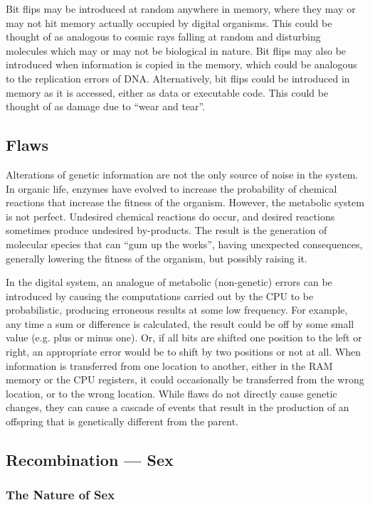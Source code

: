 Bit flips may be introduced at random anywhere in memory, where they
may or may not hit memory actually occupied by digital organisms.
This could be thought of as analogous to cosmic rays falling at random
and disturbing molecules which may or may not be biological in nature.
Bit flips may also be introduced when information is copied in the
memory, which could be analogous to the replication errors of DNA.
Alternatively, bit flips could be introduced in memory as it is accessed,
either as data or executable code.  This could be thought of as damage
due to ``wear and tear''.

\subsection{Flaws}

Alterations of genetic information are not the only source of noise in
the system.  In organic life, enzymes have evolved to increase the
probability of chemical reactions that increase the fitness of the
organism.  However, the metabolic system is not perfect.  Undesired
chemical reactions do occur, and desired reactions sometimes produce
undesired by-products.  The result is the generation of molecular
species that can ``gum up the works'', having unexpected consequences,
generally lowering the fitness of the organism, but possibly raising
it.

In the digital system, an analogue of metabolic (non-genetic) errors
can be introduced by causing the computations carried out by the CPU
to be probabilistic, producing erroneous results at some low frequency.
For example, any time a sum or difference is calculated, the result
could be off by some small value (e.g. plus or minus one).  Or, if all
bits are shifted one position to the left or right, an appropriate error
would be to shift by two positions or not at all.  When information is
transferred from one location to another, either in the RAM memory or the
CPU registers, it could occasionally be transferred from the wrong
location, or to the wrong location.  While flaws do not directly cause
genetic changes, they can cause a cascade of events that result in the
production of an offspring that is genetically different from the parent.

\subsection{Recombination --- Sex}

\subsubsection{The Nature of Sex}

